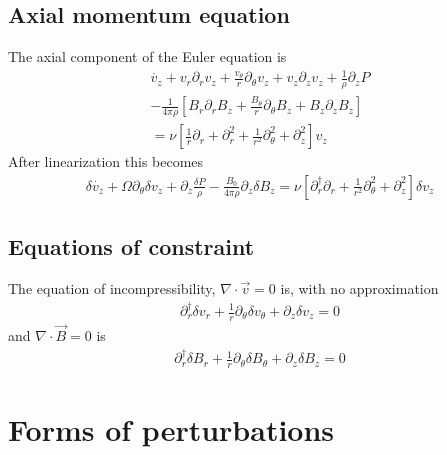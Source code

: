 \documentclass[letterpaper]{article}
\begin{document}
\subsection{Axial momentum equation}
The axial component of the Euler equation is
\begin{align}
\dot{v_z} + v_r \partial_r v_z + \frac{v_\theta}{r}\partial_\theta v_z + v_z \partial_z v_z + \frac{1}{\rho}\partial_z P
\nonumber \\
-\frac{1}{4\pi\rho}\left[B_r\partial_r B_z + \frac{B_\theta}{r}\partial_\theta B_z + B_z \partial_z B_z \right]
\nonumber \\
=\nu\left[\frac{1}{r}\partial_r + \partial_r^2 + \frac{1}{r^2}\partial_\theta^2 + \partial_z^2\right]v_z
\end{align}
After linearization this becomes
\begin{align}
\delta\dot{v_z} + \Omega \partial_\theta \delta v_z + \partial_z \frac{\delta P}{\rho} -\frac{B_0}{4\pi\rho} \partial_z \delta B_z = \nu\left[\partial_r^\dagger \partial_r + \frac{1}{r^2}\partial_\theta^2 + \partial_z^2\right]\delta v_z
\end{align}

\subsection{Equations of constraint}

The equation of incompressibility, $\nabla\cdot\vec{v}=0$ is, with no approximation
\begin{align}
\partial_r^\dagger \delta v_r + \frac{1}{r}\partial_\theta \delta v_\theta + \partial_z \delta v_z = 0
\end{align}
and $\nabla\cdot\vec{B}=0$ is
\begin{align}
\partial_r^\dagger \delta B_r + \frac{1}{r}\partial_\theta \delta B_\theta + \partial_z \delta B_z = 0
\end{align}

\section{Forms of perturbations}
\end{document}
